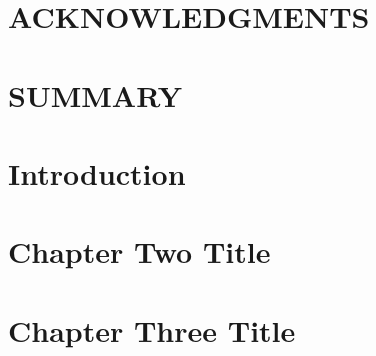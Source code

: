 \documentclass[12pt]{report}
\begin{document}
\chapter*{ACKNOWLEDGMENTS}
\vspace{7mm}
\tableofcontents

\listoffigures


\chapter*{SUMMARY}

\vspace{-7mm}

\setcounter{page}{1}
\newpage

\normalsize
\doublespacing


\chapter{Introduction}\label{chapter:Intro}

\vspace{-7mm}


\chapter{Chapter Two Title}\label{chapter:2}

\vspace{-7mm}


\chapter{Chapter Three Title}\label{chapter:3}

\vspace{-7mm}
\end{document}
